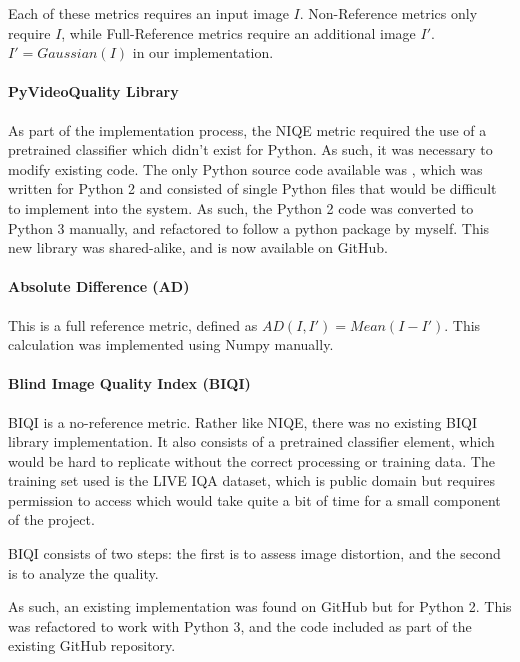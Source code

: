 \documentclass[10pt,a4paper]{article}
\begin{document}
            Each of these metrics requires an input image $I$. Non-Reference metrics only require $I$, while Full-Reference metrics require an additional image $I'$. $I' = Gaussian(I)$ in our implementation.
            
            \paragraph{PyVideoQuality Library}
            As part of the implementation process, the NIQE metric required the use of a pretrained classifier which didn't exist for Python. As such, it was necessary to modify existing code.
            The only Python source code available was \cite{VideoQualityOriginal}, which was written for Python 2 and consisted of single Python files that would be difficult to implement into the system.
            As such, the Python 2 code was converted to Python 3 manually, and refactored to follow a python package by myself. This new library was shared-alike, and is now available on GitHub. \cite{VideoQualityUpdated}
            

            \paragraph{Absolute Difference (AD)}
                This is a full reference metric, defined as $AD(I, I') = Mean(I - I')$. This calculation was implemented using Numpy manually.

            \paragraph{Blind Image Quality Index (BIQI)}
                BIQI is a no-reference metric. Rather like NIQE, there was no existing BIQI library implementation. It also consists of a pretrained classifier element, which
                would be hard to replicate without the correct processing or training data. The training set used is the LIVE IQA dataset, which is public domain but requires 
                permission to access which would take quite a bit of time for a small component of the project.

                BIQI consists of two steps: the first is to assess image distortion, and the second is to analyze the quality. 

                As such, an existing implementation was found on GitHub but for Python 2. \cite{BIQIImplementation} This was refactored to work with Python 3, and the code included as part
                of the existing GitHub repository. 
\end{document}
